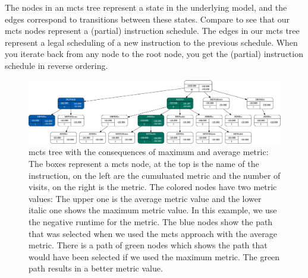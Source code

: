 The nodes in an \ac{mcts} tree represent a state in the underlying model, and the edges correspond to transitions between these states.
Compare  to see that our \ac{mcts} nodes represent a (partial) instruction schedule.
The edges in our \ac{mcts} tree represent a legal scheduling of a new instruction to the previous schedule.
When you iterate back from any node to the root node, you get the (partial) instruction schedule in reverse ordering.
\begin{figure}[p]
    \centering
    \includegraphics[width=18cm,angle=90]{data/mcts-max-vs-avg/svg/selected/8752639012199.inkscape-crop.pdf}
    \caption[\ac{mcts} tree with the consequences of maximum and average metric]{
        \ac{mcts} tree with the consequences of maximum and average metric:
        The boxes represent a \ac{mcts} node, at the top is the name of the instruction, on the left are the cumuluated metric and the number of visits, on the right is the metric.
        The colored nodes have two metric values: The upper one is the average metric value and the lower italic one shows the maximum metric value.
        In this example, we use the negative runtime for the metric.
        The blue nodes show the path that was selected when we used the \ac{mcts} approach with the average metric.
        There is a path of green nodes which shows the path that would have been selected if we used the maximum metric.
        The green path results in a better metric value.
    }
    \label{fig:approach:max-vs-avg}
\end{figure}

